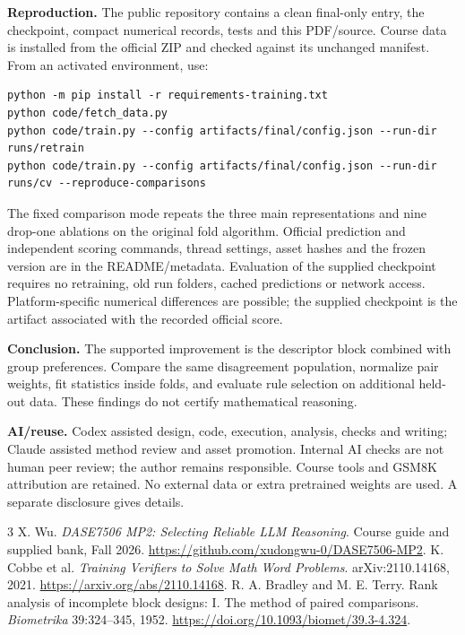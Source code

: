 \documentclass[11pt,a4paper]{article}
\begin{document}
\textbf{Reproduction.} The public repository contains a clean final-only entry,
the checkpoint, compact numerical records, tests and this PDF/source. Course
data is installed from the official ZIP and checked against its unchanged
manifest. From an activated environment, use:
{\footnotesize
\begin{verbatim}
python -m pip install -r requirements-training.txt
python code/fetch_data.py
python code/train.py --config artifacts/final/config.json --run-dir runs/retrain
python code/train.py --config artifacts/final/config.json --run-dir runs/cv --reproduce-comparisons
\end{verbatim}
}
The fixed comparison mode repeats the three main representations and nine
drop-one ablations on the original fold algorithm. Official prediction and
independent scoring commands, thread settings, asset hashes and the frozen
version are in the README/metadata. Evaluation of the supplied checkpoint
requires no retraining, old run folders, cached predictions or network access.
Platform-specific numerical differences are possible; the supplied checkpoint
is the artifact associated with the recorded official score.

\textbf{Conclusion.} The supported improvement is the descriptor block combined
with group preferences. Compare the same disagreement population, normalize
pair weights, fit statistics inside folds, and evaluate rule selection on
additional held-out data. These findings do not certify mathematical reasoning.

\textbf{AI/reuse.} Codex assisted design, code, execution, analysis, checks and
writing; Claude assisted method review and asset promotion. Internal AI checks
are not human peer review; the author remains responsible. Course tools and
GSM8K attribution are retained. No external data or extra pretrained weights are
used. A separate disclosure gives details.

\vspace{-8pt}
\begin{thebibliography}{3}\small\setlength{\itemsep}{0pt}
 X. Wu. \emph{DASE7506 MP2: Selecting Reliable LLM Reasoning}.
Course guide and supplied bank, Fall 2026.
\url{https://github.com/xudongwu-0/DASE7506-MP2}.
 K. Cobbe et al. \emph{Training Verifiers to Solve Math Word Problems}.
arXiv:2110.14168, 2021. \url{https://arxiv.org/abs/2110.14168}.
 R. A. Bradley and M. E. Terry. Rank analysis of incomplete block
designs: I. The method of paired comparisons. \emph{Biometrika} 39:324--345,
1952. \url{https://doi.org/10.1093/biomet/39.3-4.324}.
\end{thebibliography}
\end{document}
